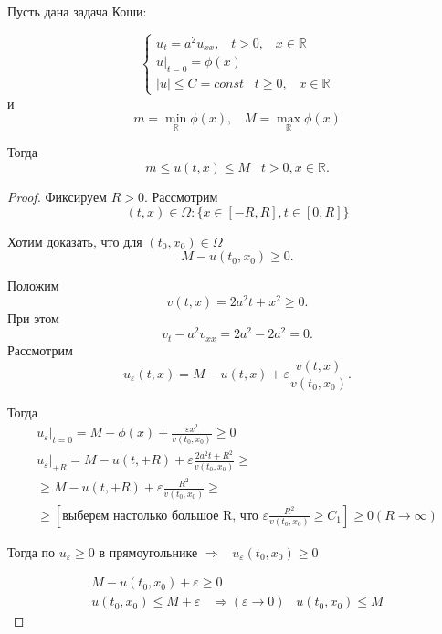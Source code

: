 \begin{theorem}
	Пусть дана задача Коши:

	\[
	\begin{cases}
		u_t = a^2u_{xx}, \; \; \; t > 0, \; \; \; x \in \mathbb{R}\\
		u|_{t=0} = \phi(x)\\
		|u| \leq C = const \; \; \; t \geq 0, \; \; \; x \in \mathbb{R}
	\end{cases}
	\]
и 
	\[
		m = \min\limits_{\mathbb{R}}\phi(x), \;\;\; M = \max_{\mathbb{R}}\phi(x)
	\]

	Тогда
	\[
		m \leq u(t,x) \leq M \; \; \; t>0, x \in \mathbb{R}.
	\]
\end{theorem}

\begin{proof}
	Фиксируем $R > 0$. Рассмотрим 
	\[
		(t,x) \in \Omega: \{x \in [-R, R], t \in [0, R]\}
	\]

	Хотим доказать, что для $(t_0, x_0) \in \Omega$
	\[
		M - u(t_0, x_0) \geq 0.
	\]

	Положим 
	\[
		v(t,x) = 2a^2t + x^2 \geq 0.
	\]
	При этом
	\[
		v_t - a^2v_{xx} = 2a^2 - 2a^2 = 0.
	\]
	Рассмотрим 
	\[	
		u_{\varepsilon}(t,x) = M - u(t,x) + \varepsilon\frac{v(t,x)}{v(t_0, x_0)}.
	\]

	Тогда
	\begin{gather*}
		u_{\varepsilon}|_{t=0} = M - \phi(x) + \frac{\varepsilon x^2}{v(t_0, x_0)} \geq 0\\
		u_{\varepsilon}|_{+R} = M - u(t, +R) + \varepsilon\frac{2a^2t + R^2}{v(t_0, x_0)} \geq\\
		\geq M - u(t, +R) + \varepsilon\frac{R^2}{v(t_0, x_0)} \geq\\
		\geq[\text{выберем настолько большое R, что } \varepsilon\frac{R^2}{v(t_0, x_0)} \geq C_1] \geq 0 (R \rightarrow \infty)
	\end{gather*}
		
	Тогда по  $u_{\varepsilon} \geq 0$ в прямоугольнике $\Rightarrow \; \; \; u_{\varepsilon}(t_0, x_0) \geq 0$

	\begin{gather*}
		M - u(t_0, x_0) + \varepsilon \geq 0\\
		u(t_0, x_0) \leq M + \varepsilon \;\;\; \Rightarrow(\varepsilon \rightarrow 0) \;\;\;  u(t_0, x_0) \leq M
	\end{gather*}

\end{proof}

